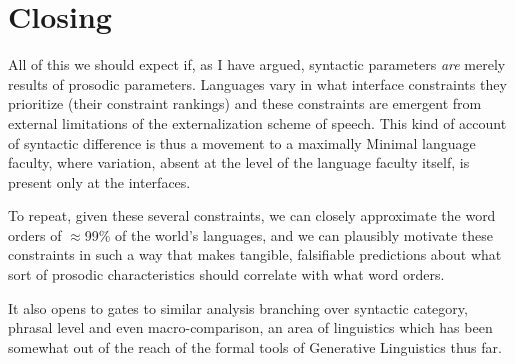 \documentclass{article}
\begin{document}
\section{Closing}

All of this we should expect if, as I have argued, syntactic parameters \emph{are} merely results of prosodic parameters.
Languages vary in what interface constraints they prioritize (their constraint rankings) and these constraints are emergent from external limitations of the externalization scheme of speech.
This kind of account of syntactic difference is thus a movement to a maximally Minimal language faculty, where variation, absent at the level of the language faculty itself, is present only at the interfaces.

To repeat, given these several constraints, we can closely approximate the word orders of $\approx$99\% of the world's languages, and we can plausibly motivate these constraints in such a way that makes tangible, falsifiable predictions about what sort of prosodic characteristics should correlate with what word orders.

It also opens to gates to similar analysis branching over syntactic category, phrasal level and even macro-comparison, an area of linguistics which has been somewhat out of the reach of the formal tools of Generative Linguistics thus far.

\printbibliography
\end{document}
